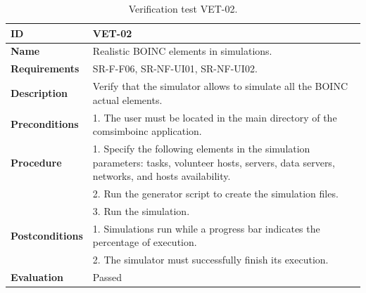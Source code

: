 \begin{center}
\begin{table}[htb]
\centering
\begin{tabular}{@{}p{2.5cm} p{13cm}@{}} 
\toprule
\textbf{ID} 					& VET-02 \\
\midrule
\textbf{Name} 				& Realistic BOINC elements in simulations. \\
\midrule
\textbf{Requirements} 		& SR-F-F06, SR-NF-UI01, SR-NF-UI02. \\
\midrule
\textbf{Description} 		& Verify that the simulator allows to simulate all the BOINC actual elements. \\
\midrule
\textbf{Preconditions}		& 1. The user must be located in the main directory of the \gls{comsimboinc} application.\\
\midrule
\textbf{Procedure}			& 1. Specify the following elements in the simulation parameters: tasks, volunteer hosts, servers, data servers, networks, and hosts availability.\\
							& 2. Run the generator script to create the simulation files.\\
							& 3. Run the simulation. \\
\midrule
\textbf{Postconditions} 		& 1. Simulations run while a progress bar indicates the percentage of execution. \\		
							& 2. The simulator must successfully finish its execution. \\
\midrule
\textbf{Evaluation} 			& Passed \\
\bottomrule
\end{tabular}
\caption{Verification test VET-02.}
\label{tab:vet02}
\end{table}
\end{center}


